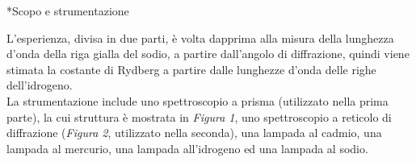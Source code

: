﻿\begin{section}*{Scopo e strumentazione}

L'esperienza, divisa in due parti, è volta dapprima alla misura della lunghezza d'onda della riga gialla del sodio, a partire dall'angolo di diffrazione, quindi viene stimata la costante di Rydberg a partire dalle lunghezze d'onda delle righe dell'idrogeno.\\ La strumentazione include uno spettroscopio a prisma (utilizzato nella prima parte), la cui struttura è mostrata in \emph{Figura 1}, uno spettroscopio a reticolo di diffrazione (\emph{Figura 2}, utilizzato nella seconda), una lampada al cadmio, una lampada al mercurio, una lampada all'idrogeno ed una lampada al sodio.


\end{section}

